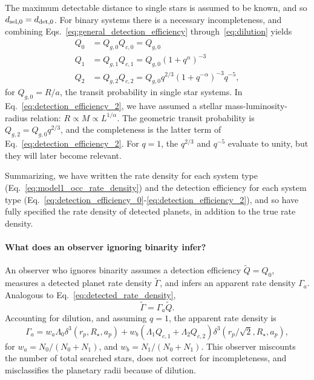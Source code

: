 The maximum detectable distance to single stars is assumed to be known, and so 
$d_{{\rm sel},0} = d_{{\rm det},0}$.
For binary systems there is a necessary incompleteness, and combining 
Eqs.~\ref{eq:general_detection_efficiency} through~\ref{eq:dilution} yields
\begin{align}
Q_0 &= Q_{g,0}Q_{c,0} = Q_{g,0} \label{eq:detection_efficiency_0}\\
Q_1 &= Q_{g,1}Q_{c,1} = Q_{g,0} (1+q^\alpha)^{-3} \\
Q_2 &= Q_{g,2}Q_{c,2} = Q_{g,0} q^{2/3} (1+q^{-\alpha})^{-3} q^{-5}, 
\label{eq:detection_efficiency_2}
\end{align}
for $Q_{g,0}=R/a$, the transit probability in single star systems.
In Eq.~\ref{eq:detection_efficiency_2}, we have assumed a stellar 
mass-luminosity-radius relation: $R\propto M \propto L^{1/\alpha}$.
The geometric transit probability is $Q_{g,2} = Q_{g,0}q^{2/3}$, and the 
completeness is the latter term of Eq.~\ref{eq:detection_efficiency_2}.
For $q=1$, the $q^{2/3}$ and $q^{-5}$ evaluate to unity, but they will later 
become relevant.

Summarizing, we have written the rate density for each system type
(Eq.~\ref{eq:model1_occ_rate_density}) and the detection efficiency for each 
system type 
(Eq.~\ref{eq:detection_efficiency_0}-\ref{eq:detection_efficiency_2}),
and so have fully specified the rate density of detected planets, 
in addition to the true rate density.


\paragraph{What does an observer ignoring binarity infer?} 
An observer who ignores binarity assumes a detection efficiency 
$\tilde{Q}=Q_0$,
measures a detected planet rate density $\tilde{\Gamma}$, 
and infers an apparent rate density $\Gamma_a$.
Analogous to Eq.~\ref{eq:detected_rate_density},
\begin{equation}
\tilde{\Gamma} = \Gamma_a \tilde{Q}.
\end{equation}
Accounting for dilution, and assuming $q=1$, the apparent rate density is
\begin{equation}
\Gamma_a = 
w_a \Lambda_0 \delta^3(r_p, R_\star, a_p) +
w_b (\Lambda_1 Q_{c,1} + \Lambda_2 Q_{c,2}) 
				\delta^3(r_p/\sqrt{2}, R_\star, a_p),
\end{equation}
for $w_a = N_0/(N_0+N_1)$, and $w_b = N_1/(N_0+N_1)$.
This observer miscounts the number of total searched stars, does not correct 
for incompleteness, and misclassifies the planetary radii because of dilution.

